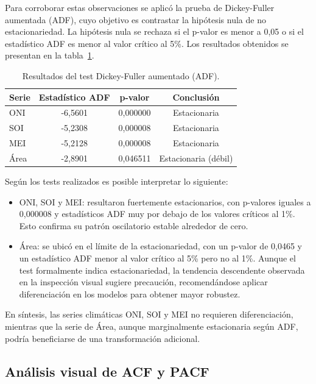 Para corroborar estas observaciones se aplicó la prueba de Dickey-Fuller aumentada (ADF), cuyo objetivo es contrastar la hipótesis nula de no estacionariedad. La hipótesis nula se rechaza si el p-valor es menor a 0,05 o si el estadístico ADF es menor al valor crítico al 5\%. Los resultados obtenidos se presentan en la tabla~\ref{tab:adf_test}.

\begin{table}[H]
    \centering
    \caption{Resultados del test Dickey-Fuller aumentado (ADF).}
    \label{tab:adf_test}
    \begin{tabular}{lccc}
        \toprule
        \textbf{Serie} & \textbf{Estadístico ADF} & \textbf{p-valor} & \textbf{Conclusión} \\
        \midrule
        ONI  & -6,5601 & 0,000000 & Estacionaria \\
        SOI  & -5,2308 & 0,000008 & Estacionaria \\
        MEI  & -5,2128 & 0,000008 & Estacionaria \\
        Área & -2,8901 & 0,046511 & Estacionaria (débil) \\
        \bottomrule
    \end{tabular}
\end{table}

Según los tests realizados es posible interpretar lo siguiente:   
\begin{itemize}
    \item ONI, SOI y MEI: resultaron fuertemente estacionarios, con p-valores 
    iguales a 0,000008 y estadísticos ADF muy por debajo de los valores críticos al 1\%. 
    Esto confirma su patrón oscilatorio estable alrededor de cero.
    \item Área: se ubicó en el límite de la estacionariedad, con un p-valor de 
    0,0465 y un estadístico ADF menor al valor crítico al 5\% pero no al 1\%. Aunque el 
    test formalmente indica estacionariedad, la tendencia descendente observada en la 
    inspección visual sugiere precaución, recomendándose aplicar diferenciación en los 
    modelos para obtener mayor robustez.
\end{itemize}


En síntesis, las series climáticas ONI, SOI y MEI no requieren diferenciación, mientras que 
la serie de Área, aunque marginalmente estacionaria según ADF, podría beneficiarse de 
una transformación adicional.

\subsection{Análisis visual de ACF y PACF}

